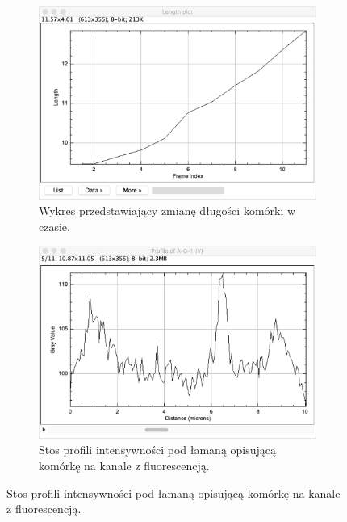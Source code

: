 \documentclass[declaration,shortabstract,mgr]{iithesis}
\begin{document}
\begin{figure}
  \centering

  \begin{subfigure}[t]{.45\textwidth}
    \centering
    \includegraphics[width=\textwidth]{images/ui-plot-lengths.png}
    \caption{\centering Wykres przedstawiający zmianę długości komórki w czasie.}
  \end{subfigure}
  \hfill
  \begin{subfigure}[t]{.45\textwidth}
    \centering
    \includegraphics[width=\textwidth]{images/ui-plot-profiles.png}
    \caption{\centering Stos profili intensywności pod łamaną opisującą komórkę na kanale z fluorescencją.}
  \end{subfigure}
  \hfill

  \par\bigskip


\end{figure}
\end{document}
